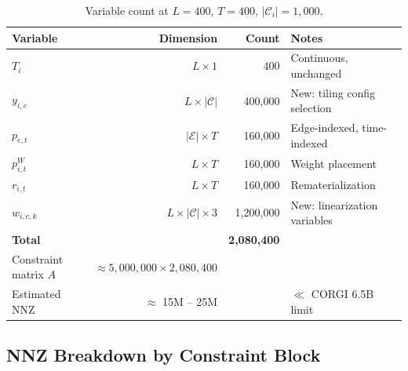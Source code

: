 \documentclass{article}
\begin{document}
\begin{table}[h!]
\centering
\begin{tabular}{lrrl}
\toprule
\textbf{Variable} & \textbf{Dimension} & \textbf{Count} & \textbf{Notes} \\
\midrule
$T_i$             & $L \times 1$              & 400           & Continuous, unchanged \\
$y_{i,c}$         & $L \times |\mathcal{C}|$  & 400,000       & New: tiling config selection \\
$p_{e,t}$         & $|\mathcal{E}| \times T$  & 160,000       & Edge-indexed, time-indexed \\
$p_{i,t}^W$       & $L \times T$              & 160,000       & Weight placement \\
$r_{i,t}$         & $L \times T$              & 160,000       & Rematerialization \\
$w_{i,c,k}$       & $L \times |\mathcal{C}| \times 3$ & 1,200,000 & New: linearization variables \\
\midrule
\textbf{Total}    &                           & \textbf{2,080,400} & \\
\midrule
Constraint matrix $A$ & $\approx 5{,}000{,}000 \times 2{,}080{,}400$ & & \\
Estimated NNZ         & $\approx$ 15M -- 25M   & & $\ll$ CORGI 6.5B limit \\
\bottomrule
\end{tabular}
\caption{Variable count at $L = 400$, $T = 400$, $|\mathcal{C}_i| = 1{,}000$.}
\end{table}

\subsection{NNZ Breakdown by Constraint Block}
\end{document}
